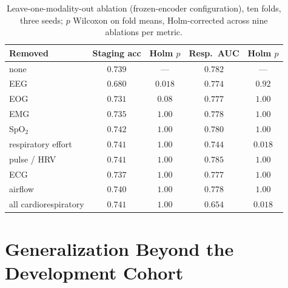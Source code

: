 \documentclass{ieeeaccess}
\begin{document}
\begin{table}[t]
\caption{Leave-one-modality-out ablation (frozen-encoder configuration), ten folds, three seeds;
$p$ Wilcoxon on fold means, Holm-corrected across nine ablations per metric.}
\label{tab:ablate}
\centering
\small
\setlength{\tabcolsep}{3pt}
\begin{tabular}{@{}lcccc@{}}
\toprule
Removed & Staging acc & Holm $p$ & Resp.\ AUC & Holm $p$ \\
\midrule
none                  & $0.739$ & ---              & $0.782$ & --- \\
EEG                   & $0.680$ & $\mathbf{0.018}$ & $0.774$ & $0.92$ \\
EOG                   & $0.731$ & $0.08$           & $0.777$ & $1.00$ \\
EMG                   & $0.735$ & $1.00$           & $0.778$ & $1.00$ \\
SpO$_2$               & $0.742$ & $1.00$           & $0.780$ & $1.00$ \\
respiratory effort    & $0.741$ & $1.00$           & $0.744$ & $\mathbf{0.018}$ \\
pulse / HRV           & $0.741$ & $1.00$           & $0.785$ & $1.00$ \\
ECG                   & $0.737$ & $1.00$           & $0.777$ & $1.00$ \\
airflow               & $0.740$ & $1.00$           & $0.778$ & $1.00$ \\
all cardiorespiratory & $0.741$ & $1.00$           & $0.654$ & $\mathbf{0.018}$ \\
\bottomrule
\end{tabular}
\end{table}

\section{Generalization Beyond the Development Cohort}
\label{sec:external}
\end{document}
